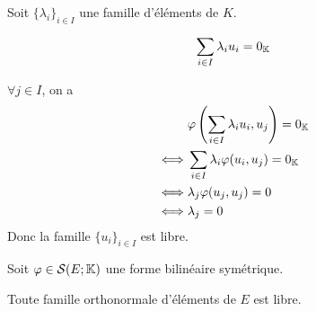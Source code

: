 \documentclass[a4paper, 12pt]{article}
\begin{document}
\begin{demonstration}
    Soit $\{\lambda_i\}_{i \in I}$ une famille d'éléments de $K$.

    $$
    \sum_{i \in I} \lambda_i u_i = 0_{\mathbb{K}}
    $$

    $\forall j \in I$, on a
    \begin{align*}
        &\varphi\left(\sum_{i \in I} \lambda_i u_i, u_j\right) = 0_{\mathbb{K}} \\
        \iff &\sum_{i \in I} \lambda_i \varphi(u_i, u_j) = 0_{\mathbb{K}} \\
        \iff &\lambda_j \varphi(u_j, u_j) = 0 \\
        \iff &\lambda_j = 0
    \end{align*}
    Donc la famille $\{u_i\}_{i \in I}$ est libre.
\end{demonstration}

\begin{corollaire}{}{}
    Soit $\varphi \in \mathcal{S}(E; \mathbb{K})$ une forme bilinéaire symétrique.

    Toute famille orthonormale d'éléments de $E$ est libre.
\end{corollaire}
\end{document}
